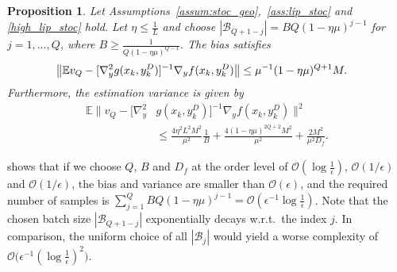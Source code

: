 \documentclass{osudissert96}
\def\gB{{\mathcal{B}}}
\newtheorem{proposition}{Proposition}
\begin{document}
\begin{proposition}\label{prop:hessian}
Let Assumptions~\ref{assum:stoc_geo},~\ref{ass:lip_stoc} and \ref{high_lip_stoc} hold. Let  $\eta\leq \frac{1}{L}$ and choose  $|\gB_{Q+1-j}|=BQ(1-\eta\mu)^{j-1}$ for $j=1,...,Q$, where $B\geq \frac{1}{Q(1-\eta\mu)^{Q-1}}$. 
The  bias satisfies   
\begin{align}{\label{bias}}
\big\|\mathbb{E} v_Q- [\nabla_y^2 g(x_k,y^D_k&)]^{-1}\nabla_y f(x_k,y^D_k)\big\| \leq  \mu^{-1}(1-\eta \mu)^{Q+1}M.
\end{align}
Furthermore, the estimation variance is given by 
\begin{align}\label{hessian_variance}
\mathbb{E}\|v_Q-[\nabla_y^2 &g(x_k,y^D_k)]^{-1}\nabla_y f(x_k,y^D_k)\|^2 \nonumber
\\&\leq\frac{4\eta^2  L^2M^2}{\mu^2} \frac{1}{B}+\frac{4(1-\eta \mu)^{2Q+2}M^2}{\mu^2}+ \frac{2M^2}{\mu^2D_f}.
\end{align}
\end{proposition}
\vspace{-0.2cm}
 shows that if we choose $Q$, $B$ and $D_f$ at the order level of $\mathcal{O}(\log \frac{1}{\epsilon}) $, $\mathcal{O}(1/\epsilon)$ and $\mathcal{O}(1/\epsilon)$,  the bias and variance are smaller than $\mathcal{O}(\epsilon)$, and the required number of samples is
$\sum_{j=1}^Q BQ(1-\eta\mu)^{j-1} = \mathcal{O}\left(\epsilon^{-1}\log \frac{1}{\epsilon}\right)$.
Note that  the chosen batch size $|\gB_{Q+1-j}|$ exponentially decays w.r.t.~the index $j$. In comparison, the uniform choice of all $|\gB_j|$ would yield a worse complexity of $ \mathcal{O}\big( \epsilon^{-1}(\log\frac{1}{\epsilon})^2\big)$.
\end{document}
